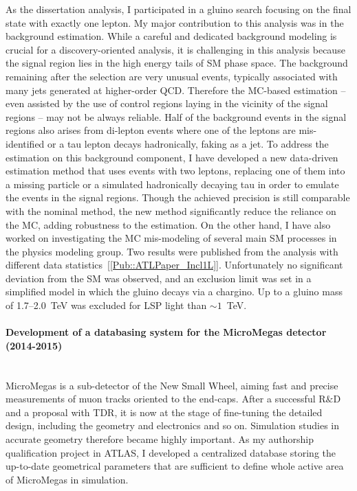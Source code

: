 \documentclass[12pt]{article}
\newcommand{\Subsubsection}[1]{\subsubsection*{#1}
\addcontentsline{toc}{subsubsection}{#1}}
\begin{document}
As the dissertation analysis, I participated in a gluino search focusing on the final state with exactly one lepton. 
My major contribution to this analysis was in the background estimation. 
While a careful and dedicated background modeling is crucial for a discovery-oriented analysis, 
it is challenging in this analysis because the signal region lies in the high energy tails of SM phase space. 
The background remaining after the selection are very unusual events, 
typically associated with many jets generated at higher-order QCD.
Therefore the MC-based estimation -- even assisted by the use of control regions laying in the vicinity of the signal regions -- may not be always reliable.
Half of the background events in the signal regions also arises from di-lepton events where one of the leptons are mis-identified or a tau lepton decays hadronically, faking as a jet.
To address the estimation on this background component, I have developed a new data-driven estimation method that uses events with two leptons, 
replacing one of them into a missing particle or a simulated hadronically decaying tau
in order to emulate the events in the signal regions.
Though the achieved precision is still comparable with the nominal method, the new method significantly reduce the reliance on the MC, adding robustness to the estimation.
On the other hand, I have also worked on investigating the MC mis-modeling of several main SM processes in the physics modeling group.
Two results were published from the analysis with different data statistics~[\ref{Pub::ATLPaper_Incl1L}]. 
Unfortunately no significant deviation from the SM was observed, and an exclusion limit was set in a simplified model in which the gluino decays via a chargino.
Up to a gluino mass of 1.7--2.0~TeV was excluded for LSP light than $\sim1$~TeV. 

\paragraph{Development of a databasing system for the MicroMegas detector (2014-2015)}  \phantom{k} \vspace{1mm} \\
MicroMegas is a sub-detector of the New Small Wheel, aiming fast and precise measurements of muon tracks oriented to the end-caps. 
After a successful  R$\&$D and a proposal with TDR, it is now at the stage of fine-tuning the detailed design, 
including the geometry and electronics and so on. 
Simulation studies in accurate geometry therefore became highly important. 
As my authorship qualification project in ATLAS, I developed a centralized database storing the up-to-date geometrical parameters that are sufficient to define whole active area of MicroMegas in simulation.  \\ \\
\end{document}
